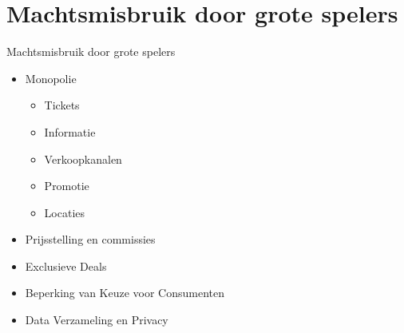 \documentclass{beamer}
\begin{document}
    

    
\section[Machtsmisbruik]{Machtsmisbruik door grote spelers}
\begin{frame}{Machtsmisbruik door grote spelers}
    \begin{itemize}
        \item Monopolie
        \begin{itemize}
            \item Tickets
            \item Informatie
            \item Verkoopkanalen
            \item Promotie
            \item Locaties
        \end{itemize}
        \item Prijsstelling en commissies
        \item Exclusieve Deals
        \item Beperking van Keuze voor Consumenten
        \item Data Verzameling en Privacy
  \end{itemize}
\end{frame}

    
\end{document}
